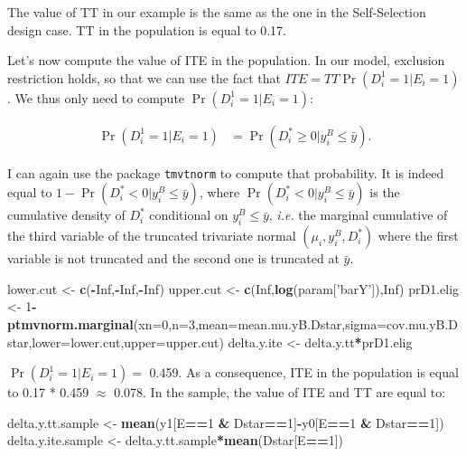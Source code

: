 \documentclass[]{book}
\newenvironment{Shaded}{\begin{snugshade}}{\end{snugshade}}
\newcommand{\KeywordTok}[1]{\textcolor[rgb]{0.13,0.29,0.53}{\textbf{#1}}}
\newcommand{\DataTypeTok}[1]{\textcolor[rgb]{0.13,0.29,0.53}{#1}}
\newcommand{\DecValTok}[1]{\textcolor[rgb]{0.00,0.00,0.81}{#1}}
\newcommand{\StringTok}[1]{\textcolor[rgb]{0.31,0.60,0.02}{#1}}
\newcommand{\OtherTok}[1]{\textcolor[rgb]{0.56,0.35,0.01}{#1}}
\newcommand{\OperatorTok}[1]{\textcolor[rgb]{0.81,0.36,0.00}{\textbf{#1}}}
\newcommand{\NormalTok}[1]{#1}
\theoremstyle{definition}
\theoremstyle{definition}
\theoremstyle{definition}
\theoremstyle{remark}
\begin{document}
The value of TT in our example is the same as the one in the
Self-Selection design case. TT in the population is equal to 0.17.

Let's now compute the value of ITE in the population. In our model,
exclusion restriction holds, so that we can use the fact that
\(ITE=TT\Pr(D^1_i=1|E_i=1)\). We thus only need to compute
\(\Pr(D^1_i=1|E_i=1)\):

\begin{align*}
  \Pr(D^1_i=1|E_i=1) & = \Pr(D_i^*\geq0|y_i^B\leq\bar{y}).
\end{align*}

I can again use the package \texttt{tmvtnorm} to compute that
probability. It is indeed equal to \(1-\Pr(D_i^*<0|y_i^B\leq\bar{y})\),
where \(\Pr(D_i^*<0|y_i^B\leq\bar{y})\) is the cumulative density of
\(D_i^*\) conditional on \(y_i^B\leq\bar{y}\), \textit{i.e.} the
marginal cumulative of the third variable of the truncated trivariate
normal \((\mu_i,y_i^B,D_i^*)\) where the first variable is not truncated
and the second one is truncated at \(\bar{y}\).

\begin{Shaded}
\begin{Highlighting}[]
\NormalTok{lower.cut <-}\StringTok{ }\KeywordTok{c}\NormalTok{(}\OperatorTok{-}\OtherTok{Inf}\NormalTok{,}\OperatorTok{-}\OtherTok{Inf}\NormalTok{,}\OperatorTok{-}\OtherTok{Inf}\NormalTok{)}
\NormalTok{upper.cut <-}\StringTok{ }\KeywordTok{c}\NormalTok{(}\OtherTok{Inf}\NormalTok{,}\KeywordTok{log}\NormalTok{(param[}\StringTok{'barY'}\NormalTok{]),}\OtherTok{Inf}\NormalTok{)}
\NormalTok{prD1.elig <-}\StringTok{ }\DecValTok{1}\OperatorTok{-}\KeywordTok{ptmvnorm.marginal}\NormalTok{(}\DataTypeTok{xn=}\DecValTok{0}\NormalTok{,}\DataTypeTok{n=}\DecValTok{3}\NormalTok{,}\DataTypeTok{mean=}\NormalTok{mean.mu.yB.Dstar,}\DataTypeTok{sigma=}\NormalTok{cov.mu.yB.Dstar,}\DataTypeTok{lower=}\NormalTok{lower.cut,}\DataTypeTok{upper=}\NormalTok{upper.cut)}
\NormalTok{delta.y.ite <-}\StringTok{ }\NormalTok{delta.y.tt}\OperatorTok{*}\NormalTok{prD1.elig}
\end{Highlighting}
\end{Shaded}

\(\Pr(D^1_i=1|E_i=1)=\) 0.459. As a consequence, ITE in the population
is equal to 0.17 * 0.459 \(\approx\) 0.078. In the sample, the value of
ITE and TT are equal to:

\begin{Shaded}
\begin{Highlighting}[]
\NormalTok{delta.y.tt.sample <-}\StringTok{ }\KeywordTok{mean}\NormalTok{(y1[E}\OperatorTok{==}\DecValTok{1} \OperatorTok{&}\StringTok{ }\NormalTok{Dstar}\OperatorTok{==}\DecValTok{1}\NormalTok{]}\OperatorTok{-}\NormalTok{y0[E}\OperatorTok{==}\DecValTok{1} \OperatorTok{&}\StringTok{ }\NormalTok{Dstar}\OperatorTok{==}\DecValTok{1}\NormalTok{])}
\NormalTok{delta.y.ite.sample <-}\StringTok{ }\NormalTok{delta.y.tt.sample}\OperatorTok{*}\KeywordTok{mean}\NormalTok{(Dstar[E}\OperatorTok{==}\DecValTok{1}\NormalTok{])}
\end{Highlighting}
\end{Shaded}
\end{document}
